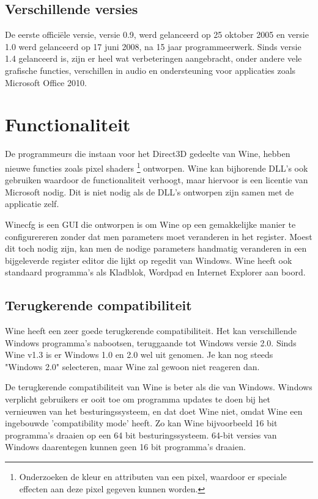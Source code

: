 \documentclass[12pt]{article}
\begin{document}
\subsection{Verschillende versies}
De eerste officiële versie, versie 0.9, werd gelanceerd op 25 oktober 2005 en versie 1.0 werd gelanceerd op 17 juni 2008, na 15 jaar programmeerwerk. 
Sinds versie 1.4 gelanceerd is, zijn er heel wat verbeteringen aangebracht, onder andere vele grafische functies, verschillen in audio en ondersteuning voor applicaties zoals Microsoft Office 2010.
\newpage
\section{Functionaliteit}
De programmeurs die instaan voor het Direct3D gedeelte van Wine, hebben nieuwe functies zoals pixel shaders \footnote{Onderzoeken de kleur en attributen van een pixel, waardoor er speciale effecten aan deze pixel gegeven kunnen worden.} ontworpen. Wine kan bijhorende DLL's ook gebruiken waardoor de functionaliteit verhoogt, maar hiervoor is een licentie van Microsoft nodig. Dit is niet nodig als de DLL's ontworpen zijn samen met de applicatie zelf.

Winecfg is een GUI die ontworpen is om Wine op een gemakkelijke manier te configurereren zonder dat men parameters moet veranderen in het register. Moest dit toch nodig zijn, kan men de nodige parameters handmatig veranderen in een bijgeleverde register editor die lijkt op regedit van Windows. Wine heeft ook standaard programma's als Kladblok, Wordpad en Internet Explorer aan boord.

\subsection{Terugkerende compatibiliteit}
Wine heeft een zeer goede terugkerende compatibiliteit. Het kan verschillende Windows programma's nabootsen, teruggaande tot Windows versie 2.0. Sinds Wine v1.3 is er Windows 1.0 en 2.0 wel uit genomen. Je kan nog steeds "Windows 2.0" selecteren, maar Wine zal gewoon niet reageren dan.

De terugkerende compatibiliteit van Wine is beter als die van Windows. Windows verplicht gebruikers er ooit toe om programma updates te doen bij het vernieuwen van het besturingssysteem, en dat doet Wine niet, omdat Wine een ingebouwde 'compatibility mode' heeft. Zo kan Wine bijvoorbeeld 16 bit programma's draaien op een 64 bit besturingssysteem. 64-bit versies van Windows daarentegen kunnen geen 16 bit programma's draaien.
\end{document}
